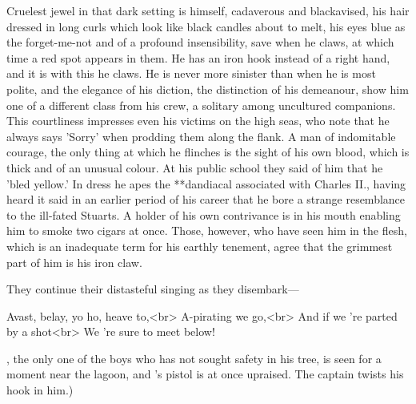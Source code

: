 \begin{stagedir}
Cruelest jewel in that dark setting is \hook himself, cadaverous and blackavised,
his hair dressed in long curls which look like black candles about to melt,
his eyes blue as the forget-me-not and of a profound insensibility,
save when he claws, at which time a red spot appears in them.
He has an iron hook instead of a right hand, and it is with this he claws.
He is never more sinister than when he is most polite,
and the elegance of his diction, the distinction of his demeanour,
show him one of a different class from his crew, a solitary among uncultured companions.
This courtliness impresses even his victims on the high seas,
who note that he always says 'Sorry' when prodding them along the flank.
A man of indomitable courage,
the only thing at which he flinches is the sight of his own blood, which is thick and of an unusual colour.
At his public school they said of him that he 'bled yellow.'
In dress he apes the **dandiacal associated with Charles II.,
having heard it said in an earlier period of his career that he bore a strange resemblance to the ill-fated Stuarts.
A holder of his own contrivance is in his mouth enabling him to smoke two cigars at once.
Those, however, who have seen him in the flesh, which is an inadequate term for his earthly tenement,
agree that the grimmest part of him is his iron claw.

They continue their distasteful singing as they disembark—

\begin{drama}
\speakercontinues
Avast, belay, yo ho, heave to,<br>
A-pirating we go,<br>
And if we 're parted by a shot<br>
We 're sure to meet below!
\end{drama}

\nibs, the only one of the boys who has not sought safety in his tree, is seen for a moment near the lagoon,
and \starkey's pistol is at once upraised.
The captain twists his hook in him.)
\end{stagedir}

